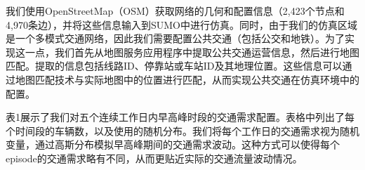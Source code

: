 我们使用OpenStreetMap（OSM）获取网络的几何和配置信息（2,423个节点和4,970条边），并将这些信息输入到SUMO中进行仿真。同时，由于我们的仿真区域是一个多模式交通网络，因此我们需要配置公共交通（包括公交和地铁）。为了实现这一点，我们首先从地图服务应用程序中提取公共交通运营信息，然后进行地图匹配。提取的信息包括线路ID、停靠站或车站ID及其地理位置。这些信息可以通过地图匹配技术与实际地图中的位置进行匹配，从而实现公共交通在仿真环境中的配置。

表1展示了我们对五个连续工作日内早高峰时段的交通需求配置。表格中列出了每个时间段的车辆数，以及使用的随机分布。我们将每个工作日的交通需求视为随机变量，通过高斯分布模拟早高峰期间的交通需求波动。这种方式可以使得每个episode的交通需求略有不同，从而更贴近实际的交通流量波动情况。